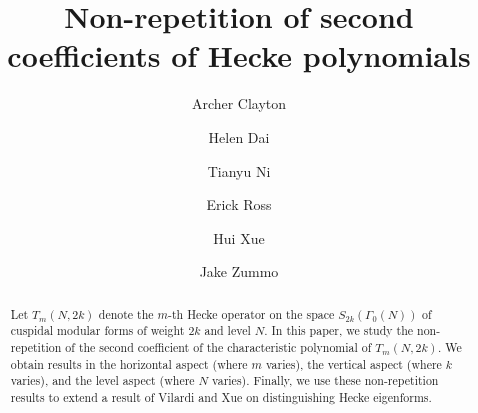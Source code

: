 \documentclass[11pt,letterpaper,reqno]{amsart}
\numberwithin{figure}{section}
\numberwithin{table}{section}
\theoremstyle{definition}
\theoremstyle{plain}
\theoremstyle{definition}
\theoremstyle{definition}
\theoremstyle{remark}
\numberwithin{equation}{section}
\begin{document}
\title{Non-repetition of second coefficients of Hecke polynomials}





\author{Archer Clayton}
\address{Department of Mathematics, Brigham Young University, Provo, UT 84602}

\author{Helen Dai}
\address{Department of Mathematics, Harvard University, 1 Oxford St, Cambridge, MA 02138}

\author{Tianyu Ni}
\address{School of Mathematical and Statistical Sciences\\
Clemson University\\
Clemson, SC 29634-0975}

\author{Erick Ross}
\address{School of Mathematical and Statistical Sciences\\
Clemson University\\
Clemson, SC 29634-0975}

\author{Hui Xue}
\address{School of Mathematical and Statistical Sciences\\
Clemson University\\
Clemson, SC 29634-0975}

\author{Jake Zummo}
\address{Department of Mathematics, The University of Chicago, Chicago, IL 60637}





\begin{abstract} 
    Let $T_m(N,2k)$ denote the $m$-th Hecke operator on the space $S_{2k}(\Gamma_0(N))$ of cuspidal modular forms of weight $2k$ and level $N$. 
    In this paper, we study the non-repetition of the second coefficient of the characteristic polynomial of  $T_m(N,2k)$. 
    We obtain results in the horizontal aspect (where $m$ varies), the vertical aspect (where $k$ varies), and the level aspect (where $N$ varies).
    Finally, we use these non-repetition results to extend a result of Vilardi and Xue on distinguishing Hecke eigenforms. 
\end{abstract}




    

\maketitle
\end{document}
